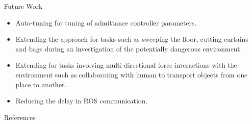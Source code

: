 \documentclass[aspectratio=43,10pt,fleqn,t]{beamer}
\begin{document}
\begin{frame}{Future Work}
	
	
	\begin{minipage}[t]{0.51\textwidth}
		\begin{itemize}
			\small  
			\item Auto-tuning for tuning of admittance controller parameters.
			\item Extending the approach for tasks such as sweeping the floor, cutting curtains and bags during an investigation of the potentially dangerous environment.
			\item Extending  for tasks involving multi-directional force interactions with the environment such as collaborating with human to transport objects from one place to another.
		\end{itemize}
	\end{minipage}
	\hfill
	\begin{minipage}[t]{0.47\textwidth}
		\begin{itemize}
			\small 
			\item Reducing the delay in ROS communication.
		\end{itemize}
	\end{minipage}
\end{frame}

\begin{frame}[allowframebreaks]{References}
	
	
	
	
\end{frame}
\end{document}
